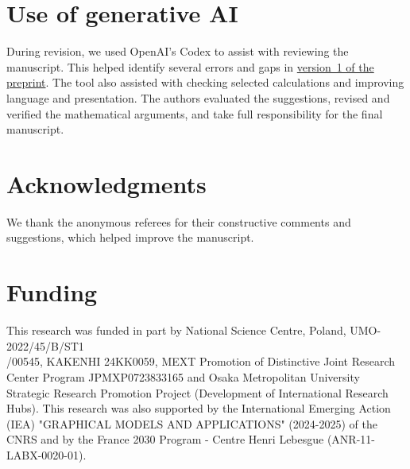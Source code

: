 \documentclass[12pt]{amsart}
\theoremstyle{plain}
\theoremstyle{definition}
\theoremstyle{remark}
\newcommand{\1}{\mathbf{1}}
\begin{document}
\section*{Use of generative AI}

During revision, we used OpenAI's Codex to assist with reviewing
the manuscript. This helped identify several errors and gaps in
\href{https://arxiv.org/abs/2601.16945v1}{version~1 of the preprint}.
The tool also assisted with checking selected calculations and
improving language and presentation. The authors evaluated the
suggestions, revised and verified the mathematical arguments, and
take full responsibility for the final manuscript.

\section*{Acknowledgments}
We thank the anonymous referees for their constructive
comments and suggestions, which helped improve the manuscript.


\section*{Funding}
This research was funded in part by National Science Centre, Poland, UMO-2022/45/B/ST1\\/00545, KAKENHI 24KK0059, MEXT Promotion of Distinctive Joint Research Center Program JPMXP0723833165 and Osaka Metropolitan University Strategic Research Promotion Project (Development of International Research Hubs). This research  was also supported by the International Emerging Action (IEA) "GRAPHICAL MODELS AND APPLICATIONS" (2024-2025) of the CNRS 
and by the France 2030 Program - Centre Henri Lebesgue (ANR-11-LABX-0020-01).






\end{document}
